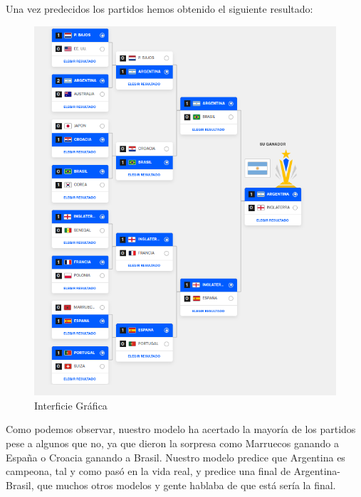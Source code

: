 Una vez predecidos los partidos hemos obtenido el siguiente resultado:

\begin{figure}[H]
\centering
\includegraphics[width=12cm]{images/prediction.png}
\caption{Interficie Gráfica}
\label{Interficie-gráfica}
\end{figure}

Como podemos observar, nuestro modelo ha acertado la mayoría de los partidos pese a algunos que no, ya que dieron la sorpresa como Marruecos ganando a España o Croacia ganando a Brasil. Nuestro modelo predice que Argentina es campeona, tal y como pasó en la vida real, y predice una final de Argentina-Brasil, que muchos otros modelos y gente hablaba de que está sería la final.

\newpage